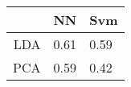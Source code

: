 \begin{tabular}{|r|l|l|}
  \hline
    & NN & Svm \\
  \hline
  LDA & 0.61 & 0.59 \\
  \hline
  PCA & 0.59 & 0.42 \\
  \hline
\end{tabular}
